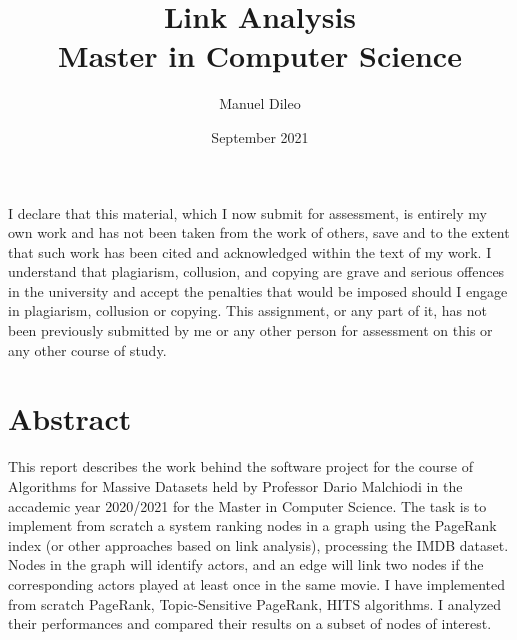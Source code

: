 \documentclass{article}
\title{%
  Link Analysis \\
  \large Master in Computer Science}
\author{Manuel Dileo}
\date{September 2021}
\begin{document}
\maketitle

I declare that this material, which I now submit for assessment, is entirely my own work and has not been taken from the work of others, save and to the extent that such work has been cited and acknowledged within the text of my work. I understand that plagiarism, collusion, and copying are grave and serious offences in the university and accept the penalties that would be imposed should I engage in plagiarism, collusion or copying. This assignment, or any part of it, has not been previously submitted by me or any other person for assessment on this or any other course of study.

\section*{Abstract}

This report describes the work behind the software project for the course of Algorithms for Massive Datasets held by Professor Dario Malchiodi in the accademic year 2020/2021 for the Master in Computer Science. The task is to implement from scratch a system ranking nodes in a graph using the PageRank index (or other approaches based on link analysis), processing the IMDB dataset. Nodes in the graph will identify actors, and an edge will link two nodes if the corresponding actors played at least once in the same movie. I have implemented from scratch PageRank, Topic-Sensitive PageRank, HITS algorithms. I analyzed their performances and compared their results on a subset of nodes of interest.

\pagebreak
\end{document}
